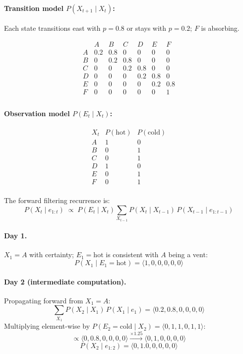 \documentclass[12pt]{article}
\begin{document}
\paragraph{Transition model $P(X_{t+1}\mid X_t)$:}
Each state transitions east with $p=0.8$ or stays with $p=0.2$; $F$ is absorbing.

\[
\begin{array}{c|cccccc}
 & A & B & C & D & E & F\\
\hline
A & 0.2 & 0.8 & 0 & 0 & 0 & 0\\
B & 0 & 0.2 & 0.8 & 0 & 0 & 0\\
C & 0 & 0 & 0.2 & 0.8 & 0 & 0\\
D & 0 & 0 & 0 & 0.2 & 0.8 & 0\\
E & 0 & 0 & 0 & 0 & 0.2 & 0.8\\
F & 0 & 0 & 0 & 0 & 0 & 1\\
\end{array}
\]

\paragraph{Observation model $P(E_t\mid X_t)$:}

\[
\begin{array}{c|cc}
X_t & P(\text{hot}) & P(\text{cold})\\
\hline
A & 1 & 0\\
B & 0 & 1\\
C & 0 & 1\\
D & 1 & 0\\
E & 0 & 1\\
F & 0 & 1\\
\end{array}
\]

The forward filtering recurrence is:
\[
P(X_t\mid e_{1:t})\;\propto\;
P(E_t\mid X_t)\sum_{X_{t-1}}P(X_t\mid X_{t-1})\,P(X_{t-1}\mid e_{1:t-1})
\]

\paragraph{Day 1.}
$X_1=A$ with certainty; $E_1=\text{hot}$ is consistent with $A$ being a vent:
\[
P(X_1\mid E_1{=}\text{hot})=\langle1,0,0,0,0,0\rangle
\]

\paragraph{Day 2 (intermediate computation).}
Propagating forward from $X_1=A$:
\[
\sum_{X_1}P(X_2\mid X_1)\,P(X_1\mid e_1)
=\langle0.2,0.8,0,0,0,0\rangle
\]
Multiplying element-wise by $P(E_2{=}\text{cold}\mid X_2)=\langle0,1,1,0,1,1\rangle$:
\[
\propto\langle0,0.8,0,0,0,0\rangle\xrightarrow{\times1.25}\langle0,1,0,0,0,0\rangle
\]
\[
P(X_2\mid e_{1:2})=\langle0,1.0,0,0,0,0\rangle
\]
\end{document}
